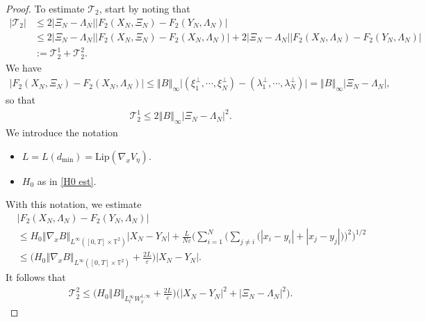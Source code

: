 \documentclass[10pt,a4paper]{amsart}
\begin{document}
\begin{proof}
To estimate $\mathcal{T}_{2}$,  start by noting that 
\begin{align*}
|\mathcal{T}_{2}|&\leq 2\left\vert \Xi_{N}-\Lambda_{N}\right\vert \left\vert F_{2}(X_{N},\Xi_{N})-F_{2}(Y_{N},\Lambda_{N})\right\vert\\
&\leq 2\left\vert \Xi_{N}-\Lambda_{N}\right\vert \left\vert F_{2}(X_{N},\Xi_{N})-F_{2}(X_{N},\Lambda_{N})\right\vert+2\left\vert \Xi_{N}-\Lambda_{N}\right\vert \left\vert F_{2}(X_{N},\Lambda_{N})-F_{2}(Y_{N},\Lambda_{N})\right\vert\\
&:=\mathcal{T}_{2}^{1}+\mathcal{T}_{2}^{2}. 
\end{align*}
We have 
\begin{align*}
\left\vert F_{2}(X_{N},\Xi_{N})-F_{2}(X_{N},\Lambda_{N})\right\vert
\leq \left\Vert B\right\Vert_{\infty}\big\vert (\xi_{1}^{\perp},\cdots\!,\xi_{N}^{\perp})-(\lambda_{1}^{\perp},\cdots\!,\lambda_{N}^{\perp})\big\vert
=\left\Vert B\right\Vert_{\infty}\left\vert \Xi_{N}-\Lambda_{N}\right\vert,          
\end{align*}
so that
\begin{align}
\mathcal{T}_{2}^{1}\leq  2\left\Vert B\right\Vert_{\infty} \left\vert \Xi_{N}-\Lambda_{N}\right\vert^{2}.\label{est on T12}     
\end{align}
We introduce the notation 
\begin{itemize}
  \item[{\rm(a)}]$L=L(d_{\min})=\mathrm{Lip}(\nabla_{x}V_{\eta})$.
   \item[{\rm(b)}] $H_{0}$ as in \eqref{H0 est}. 
\end{itemize}
With this notation, we estimate 
\begin{align*}
&\left\vert F_{2}(X_{N},\Lambda_{N})-F_{2}(Y_{N},\Lambda_{N})\right\vert\\
&\leq H_{0}\left\Vert \nabla_xB\right\Vert_{L^{\infty}([0,T]\times\mathbb T^2)}\left\vert X_{N}-Y_{N}\right\vert
+\frac{L}{N\varepsilon}
\bigg(\sum_{i=1}^{N}\Big(\sum_{j\ne i}
\bigl(|x_i-y_i|+|x_j-y_j|\bigr)\Big)^2\bigg)^{1/2}\\
&\leq \big(H_{0}\left\Vert \nabla_xB\right\Vert_{L^{\infty}([0,T]\times\mathbb T^2)}+\frac{2L}{\varepsilon}\big)\left\vert X_{N}-Y_{N}\right\vert.
\end{align*}
It follows that 
\begin{align}
\mathcal{T}^{2}_{2}\leq \big(H_{0}\left\Vert B\right\Vert_{L^{\infty}_{t}W^{1,\infty}_{x}} +\frac{2L}{\varepsilon}\big)\big(\left\vert X_{N}-Y_{N}\right\vert^{2}+\left\vert \Xi_{N}-\Lambda_{N}\right\vert^{2}\big). \label{est on T22} 

\end{align}
\end{proof}
\end{document}
